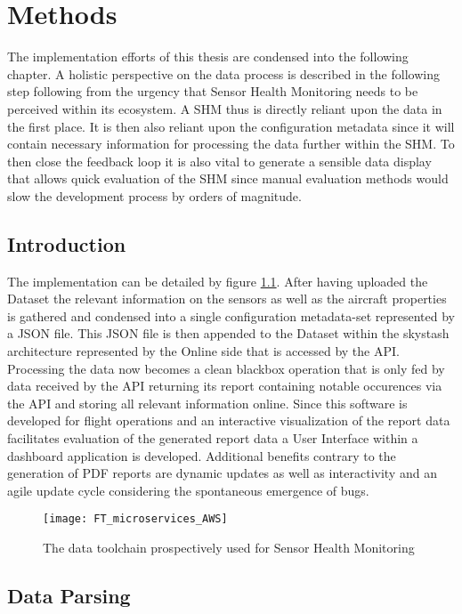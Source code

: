 \chapter{Methods}

The implementation efforts of this thesis are condensed into the following chapter. A holistic perspective on the data process is described in the following step following from the urgency that Sensor Health Monitoring needs to be perceived within its ecosystem. A SHM thus is directly reliant upon the data in the first place. It is then also reliant upon the configuration metadata since it will contain necessary information for processing the data further within the SHM. To then close the feedback loop it is also vital to generate a sensible data display that allows quick evaluation of the SHM since manual evaluation methods would slow the development process by orders of magnitude.


\section{Introduction}


The implementation can be detailed by figure \ref{fig:fti_microservices}. After having uploaded the Dataset the relevant information on the sensors as well as the aircraft properties is gathered and condensed into a single configuration metadata-set represented by a JSON file. This JSON file is then appended to the Dataset within the skystash architecture represented by the Online side that is accessed by the API. Processing the data now becomes a clean blackbox operation that is only fed by data received by the API returning its report containing notable occurences via the API and storing all relevant information online. Since this software is developed for flight operations and an interactive visualization of the report data facilitates evaluation of the generated report data a User Interface within a dashboard application is developed. Additional benefits contrary to the generation of PDF reports are dynamic updates as well as interactivity and an agile update cycle considering the spontaneous emergence of bugs.


\begin{figure}[h]
    \centering
    \texttt{[image: FT\_microservices\_AWS]}
    \caption{The data toolchain prospectively used for Sensor Health Monitoring}
    \label{fig:fti_microservices}
\end{figure}


\section{Data Parsing}

